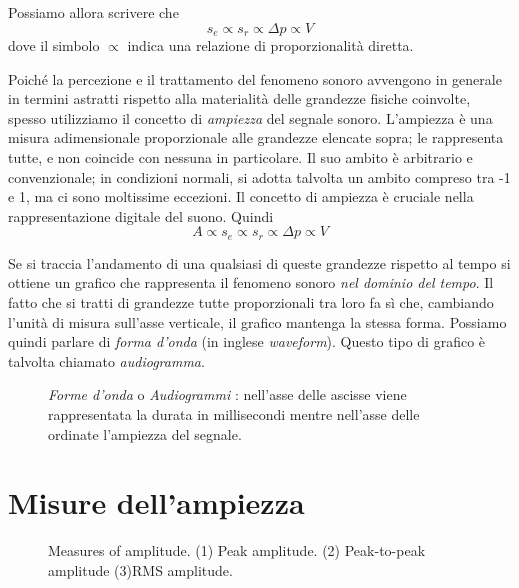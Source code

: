Possiamo allora scrivere che
\begin{equation}
s_e \propto s_r \propto \Delta p \propto V
\end{equation}
dove il simbolo $\propto$ indica una relazione di proporzionalità diretta.

Poiché la percezione e il trattamento del fenomeno sonoro avvengono in generale in termini astratti rispetto alla materialità delle grandezze fisiche coinvolte, spesso utilizziamo il concetto di \emph{ampiezza} del segnale sonoro. L'ampiezza è una misura adimensionale proporzionale alle grandezze elencate sopra; le rappresenta tutte, e non coincide con nessuna in particolare. Il suo ambito è arbitrario e convenzionale; in condizioni normali, si adotta talvolta un ambito compreso tra -1 e 1, ma ci sono moltissime eccezioni. Il concetto di ampiezza è cruciale nella rappresentazione digitale del suono. Quindi
\begin{equation}
A \propto s_e \propto s_r \propto \Delta p \propto V
\end{equation}

Se si traccia l'andamento di una qualsiasi di queste grandezze rispetto al tempo si ottiene un grafico che rappresenta il fenomeno sonoro \emph{nel dominio del tempo}. Il fatto che si tratti di grandezze tutte proporzionali tra loro fa sì che, cambiando l'unità di misura sull'asse verticale, il grafico mantenga la stessa forma. Possiamo quindi parlare di \emph{forma d'onda} (in inglese \emph{waveform}). Questo tipo di grafico è talvolta chiamato \emph{audiogramma}.


\begin{figure}
    \begin{center}
       \scalebox{0.6} {}
    \end{center}
    \caption{\emph{Forme d'onda} o \emph{Audiogrammi} : nell'asse delle ascisse viene rappresentata la durata in millisecondi mentre nell'asse delle ordinate l'ampiezza del segnale.}
\end{figure}



\section{Misure dell'ampiezza}

\begin{figure}
    \begin{center}
       \scalebox{0.6} {}
    \end{center}
    \caption{Measures of amplitude. (1) Peak amplitude. (2) Peak-to-peak amplitude (3)RMS amplitude.}
\end{figure}

